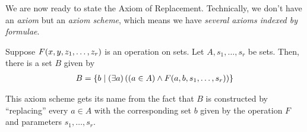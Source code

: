 We are now ready to state the Axiom of Replacement. Technically, we don't have an \textit{axiom} but an \textit{axiom scheme}, which means we have \textit{several axioms indexed by formulae}.

\begin{baxiom}
    Suppose $F\!\left( x, y, z_1, \ldots, z_r \right)$ is an operation on sets. Let $A, s_1, \ldots, s_r$ be sets. Then, there is a set $B$ given by
    \begin{align*}
        B = \left\{ b \; \middle\vert \; \left( \exists a \right)\left( \left( a \in A \right) \land F\!\left( a, b, s_1, \ldots, s_r \right) \right) \right\}
    \end{align*}
\end{baxiom}

This axiom scheme gets its name from the fact that $B$ is constructed by ``replacing'' every $a \in A$ with the corresponding set $b$ given by the operation $F$ and parameters $s_1, \ldots, s_r$.